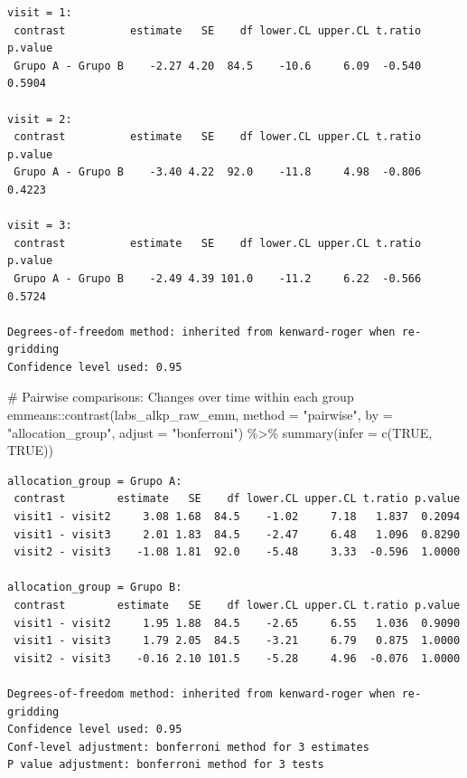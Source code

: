 \documentclass[
  letterpaper,
  DIV=11,
  numbers=noendperiod]{scrartcl}
\newenvironment{Shaded}{\begin{snugshade}}{\end{snugshade}}
\newcommand{\AttributeTok}[1]{\textcolor[rgb]{0.40,0.45,0.13}{#1}}
\newcommand{\CommentTok}[1]{\textcolor[rgb]{0.37,0.37,0.37}{#1}}
\newcommand{\ConstantTok}[1]{\textcolor[rgb]{0.56,0.35,0.01}{#1}}
\newcommand{\FunctionTok}[1]{\textcolor[rgb]{0.28,0.35,0.67}{#1}}
\newcommand{\NormalTok}[1]{\textcolor[rgb]{0.00,0.23,0.31}{#1}}
\newcommand{\SpecialCharTok}[1]{\textcolor[rgb]{0.37,0.37,0.37}{#1}}
\newcommand{\StringTok}[1]{\textcolor[rgb]{0.13,0.47,0.30}{#1}}
\begin{document}
\begin{verbatim}
visit = 1:
 contrast          estimate   SE    df lower.CL upper.CL t.ratio p.value
 Grupo A - Grupo B    -2.27 4.20  84.5    -10.6     6.09  -0.540  0.5904

visit = 2:
 contrast          estimate   SE    df lower.CL upper.CL t.ratio p.value
 Grupo A - Grupo B    -3.40 4.22  92.0    -11.8     4.98  -0.806  0.4223

visit = 3:
 contrast          estimate   SE    df lower.CL upper.CL t.ratio p.value
 Grupo A - Grupo B    -2.49 4.39 101.0    -11.2     6.22  -0.566  0.5724

Degrees-of-freedom method: inherited from kenward-roger when re-gridding 
Confidence level used: 0.95 
\end{verbatim}

\begin{Shaded}
\begin{Highlighting}[]
\CommentTok{\# Pairwise comparisons: Changes over time within each group}
\NormalTok{emmeans}\SpecialCharTok{::}\FunctionTok{contrast}\NormalTok{(labs\_alkp\_raw\_emm, }\AttributeTok{method =} \StringTok{"pairwise"}\NormalTok{, }\AttributeTok{by =} \StringTok{"allocation\_group"}\NormalTok{, }\AttributeTok{adjust =} \StringTok{"bonferroni"}\NormalTok{) }\SpecialCharTok{\%\textgreater{}\%} \FunctionTok{summary}\NormalTok{(}\AttributeTok{infer =} \FunctionTok{c}\NormalTok{(}\ConstantTok{TRUE}\NormalTok{, }\ConstantTok{TRUE}\NormalTok{))}
\end{Highlighting}
\end{Shaded}

\begin{verbatim}
allocation_group = Grupo A:
 contrast        estimate   SE    df lower.CL upper.CL t.ratio p.value
 visit1 - visit2     3.08 1.68  84.5    -1.02     7.18   1.837  0.2094
 visit1 - visit3     2.01 1.83  84.5    -2.47     6.48   1.096  0.8290
 visit2 - visit3    -1.08 1.81  92.0    -5.48     3.33  -0.596  1.0000

allocation_group = Grupo B:
 contrast        estimate   SE    df lower.CL upper.CL t.ratio p.value
 visit1 - visit2     1.95 1.88  84.5    -2.65     6.55   1.036  0.9090
 visit1 - visit3     1.79 2.05  84.5    -3.21     6.79   0.875  1.0000
 visit2 - visit3    -0.16 2.10 101.5    -5.28     4.96  -0.076  1.0000

Degrees-of-freedom method: inherited from kenward-roger when re-gridding 
Confidence level used: 0.95 
Conf-level adjustment: bonferroni method for 3 estimates 
P value adjustment: bonferroni method for 3 tests 
\end{verbatim}
\end{document}

